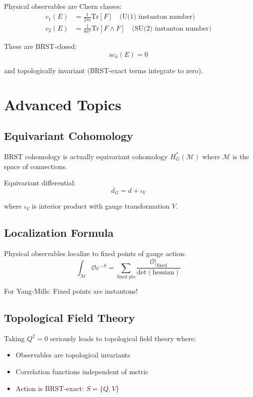 Physical observables are Chern classes:
\begin{align}
c_1(E) &= \frac{1}{2\pi i} \text{Tr}[F] \quad \text{(U(1) instanton number)} \\
c_2(E) &= \frac{1}{8\pi^2} \text{Tr}[F \wedge F] \quad \text{(SU(2) instanton number)}
\end{align}

These are BRST-closed:
\begin{equation}
s c_k(E) = 0
\end{equation}

and topologically invariant (BRST-exact terms integrate to zero).

\section{Advanced Topics}

\subsection{Equivariant Cohomology}

BRST cohomology is actually equivariant cohomology $H^*_G(\mathcal{M})$ where $\mathcal{M}$ is the space of connections.

Equivariant differential:
\begin{equation}
d_G = d + \iota_V
\end{equation}

where $\iota_V$ is interior product with gauge transformation $V$.

\subsection{Localization Formula}

Physical observables localize to fixed points of gauge action:
\begin{equation}
\int_{\mathcal{M}} \mathcal{O} e^{-S} = \sum_{\text{fixed pts}} \frac{\mathcal{O}|_{\text{fixed}}}{\text{det}(\text{hessian})}
\end{equation}

For Yang-Mills: Fixed points are instantons!

\subsection{Topological Field Theory}

Taking $Q^2 = 0$ seriously leads to topological field theory where:
\begin{itemize}
\item Observables are topological invariants
\item Correlation functions independent of metric
\item Action is BRST-exact: $S = \{Q, V\}$
\end{itemize}


